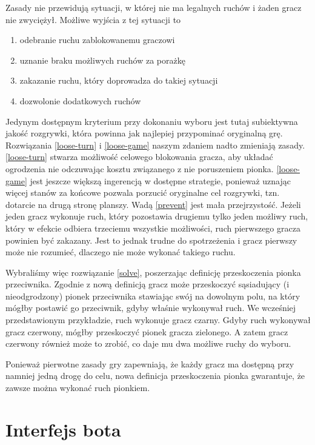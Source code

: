 \documentclass{pracamgr}
\begin{document}
Zasady nie przewidują sytuacji, w której nie ma legalnych ruchów i żaden gracz nie zwyciężył.
Możliwe wyjścia z tej sytuacji to

\begin{enumerate}
\item \label{loose-turn} odebranie ruchu zablokowanemu graczowi
\item \label{loose-game} uznanie braku możliwych ruchów za porażkę
\item \label{prevent} zakazanie ruchu, który doprowadza do takiej sytuacji
\item \label{solve} dozwolonie dodatkowych ruchów
\end {enumerate}

Jedynym dostępnym kryterium przy dokonaniu wyboru jest tutaj subiektywna jakość rozgrywki, która powinna jak najlepiej przypominać oryginalną grę.
Rozwiązania \ref{loose-turn} i \ref{loose-game} naszym zdaniem nadto zmieniają zasady.
\ref{loose-turn} stwarza możliwość celowego blokowania gracza, aby układać ogrodzenia nie odczuwając kosztu związanego z nie poruszeniem pionka.
\ref{loose-game} jest jeszcze większą ingerencją w dostępne strategie, ponieważ uznając więcej stanów za końcowe pozwala porzucić oryginalne cel rozgrywki, tzn. dotarcie na drugą stronę planszy.
Wadą \ref{prevent} jest mała przejrzystość.
Jeżeli jeden gracz wykonuje ruch, który pozostawia drugiemu tylko jeden możliwy ruch, który w efekcie odbiera trzeciemu wszystkie możliwości, ruch pierwszego gracza powinien być zakazany.
Jest to jednak trudne do spotrzeżenia i gracz pierwszy może nie rozumieć, dlaczego nie może wykonać takiego ruchu.

Wybraliśmy więc rozwiązanie \ref{solve}, poszerzając definicję przeskoczenia pionka przeciwnika.
Zgodnie z nową definicją gracz może przeskoczyć sąsiadujący (i nieodgrodzony) pionek przeciwnika stawiając swój  na dowolnym polu, na który mógłby postawić go przeciwnik, gdyby właśnie wykonywał ruch.
We wcześniej przedstawionym przykładzie, ruch wykonuje gracz czarny.
Gdyby ruch wykonywał gracz czerwony, mógłby przeskoczyć pionek gracza zielonego.
A zatem gracz czerwony również może to zrobić, co daje mu dwa możliwe ruchy do wyboru.

Ponieważ pierwotne zasady gry zapewniają, że każdy gracz ma dostępną przy namniej jedną drogę do celu, nowa definicja przeskoczenia pionka gwarantuje, że zawsze można wykonać ruch pionkiem.

\section{Interfejs bota}
\end{document}
